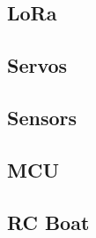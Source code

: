 
\subsection{LoRa}


\subsection{Servos}


\subsection{Sensors}


\subsection{MCU}


\subsection{RC Boat}

